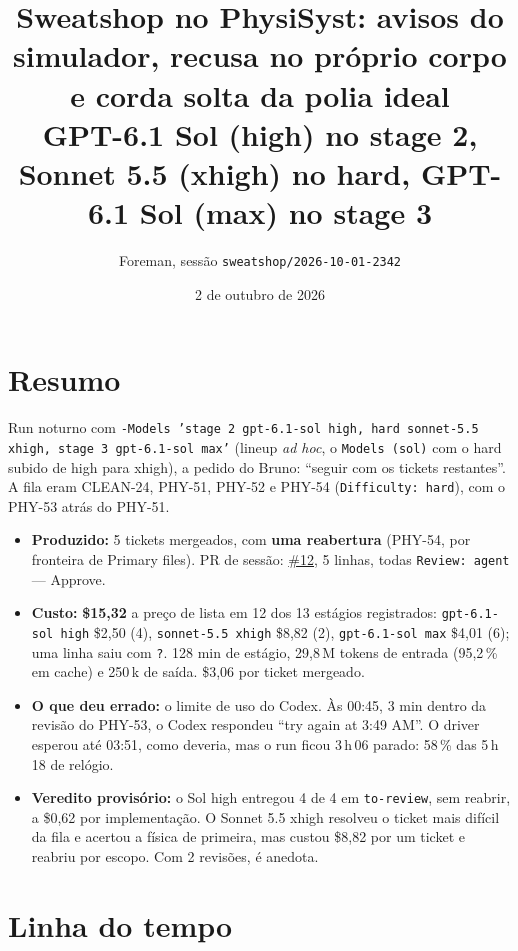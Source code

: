 \documentclass[11pt,a4paper]{article}
\title{Sweatshop no PhysiSyst: avisos do simulador, recusa no próprio corpo e corda solta da polia ideal\\\large GPT-6.1 Sol (high) no stage 2, Sonnet 5.5 (xhigh) no hard, GPT-6.1 Sol (max) no stage 3}
\author{Foreman, sessão \texttt{sweatshop/2026-10-01-2342}}
\date{2 de outubro de 2026}
\begin{document}
\maketitle

\section*{Resumo}

Run noturno com
\texttt{-Models 'stage 2 gpt-6.1-sol high, hard sonnet-5.5 xhigh, stage 3
gpt-6.1-sol max'} (lineup \emph{ad hoc}, o \texttt{Models (sol)} com o hard
subido de high para xhigh), a pedido do Bruno: ``seguir com os tickets
restantes''. A fila eram CLEAN-24, PHY-51, PHY-52 e PHY-54 (\texttt{Difficulty:
hard}), com o PHY-53 atrás do PHY-51.

\begin{itemize}
  \item \textbf{Produzido:} 5 tickets mergeados, com \textbf{uma reabertura}
        (PHY-54, por fronteira de Primary files). PR de sessão:
        \href{https://github.com/Laginho/PhysiSyst/pull/12}{\#12}, 5 linhas,
        todas \texttt{Review: agent} --- Approve.
  \item \textbf{Custo:} \textbf{\$15,32} a preço de lista em 12 dos 13
        estágios registrados: \texttt{gpt-6.1-sol high} \$2,50 (4),
        \texttt{sonnet-5.5 xhigh} \$8,82 (2), \texttt{gpt-6.1-sol max} \$4,01
        (6); uma linha saiu com \texttt{?}. 128 min de estágio, 29,8\,M tokens
        de entrada (95,2\,\% em cache) e 250\,k de saída. \$3,06 por ticket
        mergeado.
  \item \textbf{O que deu errado:} o limite de uso do Codex. Às 00:45, 3 min
        dentro da revisão do PHY-53, o Codex respondeu ``try again at
        3:49 AM''. O driver esperou até 03:51, como deveria, mas o run ficou
        3\,h\,06 parado: 58\,\% das 5\,h\,18 de relógio.
  \item \textbf{Veredito provisório:} o Sol high entregou 4 de 4 em
        \texttt{to-review}, sem reabrir, a \$0,62 por implementação. O Sonnet
        5.5 xhigh resolveu o ticket mais difícil da fila e acertou a física de
        primeira, mas custou \$8,82 por um ticket e reabriu por escopo. Com 2
        revisões, é anedota.
\end{itemize}

\section{Linha do tempo}
\end{document}
